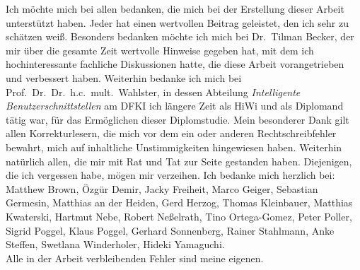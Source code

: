 Ich möchte mich bei allen bedanken, die mich bei der Erstellung dieser Arbeit 
unterstützt haben. Jeder hat einen wertvollen Beitrag geleistet, 
den ich sehr zu schätzen weiß. Besonders bedanken möchte ich mich bei 
Dr.~Tilman Becker, der mir über die gesamte Zeit wertvolle Hinweise gegeben hat, 
mit dem ich hochinteressante fachliche Diskussionen hatte, die diese Arbeit 
vorangetrieben und verbessert haben. 
Weiterhin bedanke ich mich bei Prof.~Dr.~Dr.~h.c.~mult.~Wahlster, 
in dessen Abteilung \emph{Intelligente Benutzerschnittstellen} am DFKI ich 
längere Zeit als HiWi 
und als Diplomand tätig war, für das Ermöglichen dieser Diplomstudie.
Mein besonderer Dank gilt allen Korrekturlesern, die mich vor dem ein 
oder anderen
Rechtschreibfehler bewahrt, mich auf inhaltliche Unstimmigkeiten 
hingewiesen haben.
Weiterhin natürlich allen, die mir mit Rat und Tat zur Seite gestanden haben. 
Diejenigen, die ich vergessen habe, mögen mir verzeihen.
Ich bedanke mich herzlich bei:\\
Matthew Brown,
Özgür Demir,
Jacky Freiheit,
Marco Geiger,
Sebastian Germesin,
Matthias an der Heiden,
Gerd Herzog,
Thomas Kleinbauer,
Matthias Kwaterski, 
Hartmut Nebe,
Robert Neßelrath,
Tino Ortega-Gomez,
Peter Poller,
Sigrid Poggel,
Klaus Poggel,
Gerhard Sonnenberg,
Rainer Stahlmann,
Anke Steffen,
Swetlana Winderholer,
Hideki Yamaguchi.  \\
Alle in der Arbeit verbleibenden Fehler sind meine eigenen.
